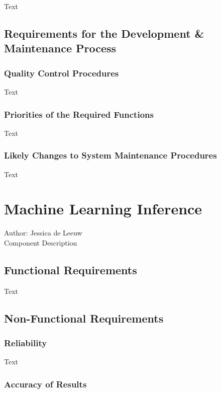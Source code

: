 \documentclass[12pt]{article}
\begin{document}
Text

\subsection{Requirements for the Development & Maintenance Process}

\subsubsection {Quality Control Procedures}

Text

\subsubsection {Priorities of the Required Functions}

Text

\subsubsection {Likely Changes to System Maintenance Procedures}

Text

\section{Machine Learning Inference}
Author: Jessica de Leeuw\\

\noindent Component Description

\subsection{Functional Requirements}

Text

\subsection{Non-Functional Requirements}

\subsubsection {Reliability}

Text

\subsubsection {Accuracy of Results}
 
\end{document}
